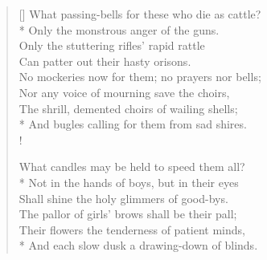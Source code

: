 \documentclass[MAIN]{subfiles}
\begin{document}
\settowidth{\versewidth}{No mockeries now for them; no prayers nor bells;}
\begin{verse}[\versewidth]
What passing-bells for these who die as cattle?\\*
\vin Only the monstrous anger of the guns.\\
Only the stuttering rifles' rapid rattle\\
\vin Can patter out their hasty orisons.\\
No mockeries now for them; no prayers nor bells;\\
\vin Nor any voice of mourning save the choirs,\\
The shrill, demented choirs of wailing shells;\\*
\vin And bugles calling for them from sad shires.\\!

What candles may be held to speed them all?\\*
\vin Not in the hands of boys, but in their eyes\\
\vin Shall shine the holy glimmers of good-bys.\\
The pallor of girls' brows shall be their pall;\\
Their flowers the tenderness of patient minds,\\*
And each slow dusk a drawing-down of blinds.
\end{verse}
\end{document}
